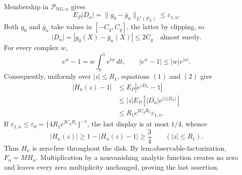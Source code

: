 Membership in \(\mathcal P_{\mathrm{NG},n}\) gives
\[
 E_P|D_n|
 =\|g_0-\bar g_n\|_{L^1(P_X)}
 \le\varepsilon_{1,n}. \tag{1}
\]
Both \(g_0\) and \(\bar g_n\) take values in \([-C_g,C_g]\), the latter by clipping, so
\[
 |D_n|=|g_0(X)-\bar g_n(X)|\le2C_g
 \quad\text{almost surely}. \tag{2}
\]
For every complex \(w\),
\[
 e^w-1=w\int_0^1e^{tw}\,dt,
 \qquad
 |e^w-1|\le |w|e^{|w|}.
\]
Consequently, uniformly over \(|z|\le R_1\), equations \((1)\) and \((2)\) give
\[
 \begin{aligned}
 |H_n(z)-1|
 &\le E_P|e^{zD_n}-1|\\
 &\le |z|E_P[|D_n|e^{|z||D_n|}]\\
 &\le R_1e^{2C_gR_1}\varepsilon_{1,n}.
 \end{aligned}
\]
If \(\varepsilon_{1,n}\le\varepsilon_0=\{4R_1e^{2C_gR_1}\}^{-1}\), the last display is at most \(1/4\), whence
\[
 |H_n(z)|\ge1-|H_n(z)-1|\ge\frac34
 \qquad (|z|\le R_1).
\]
Thus \(H_n\) is zero-free throughout the disk.  By \(\text{lem:observable-factorization}\), \(F_n=M H_n\).  Multiplication by a nonvanishing analytic function creates no zero and leaves every zero multiplicity unchanged, proving the last assertion.